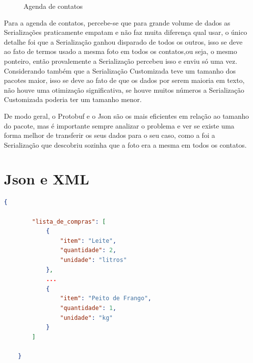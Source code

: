 \documentclass{article}
\begin{document}
\begin{figure}[H]
    \centering
    \caption{Agenda de contatos}
\end{figure}
Para a agenda de contatos, percebe-se que para grande volume de dados as Serializações praticamente empatam e não faz muita diferença qual usar, o único detalhe foi que a Serialização ganhou disparado de todos os outros, isso se deve ao fato de termos usado a mesma foto em todos os contatos,ou seja, o mesmo ponteiro, então provalemente a Serialização percebeu isso e enviu só uma vez. Considerando também que a Serialização Customizada teve um tamanho dos pacotes maior, isso se deve ao fato de que os dados por serem maioria em texto, não houve uma otimização significativa, se houve muitos números a Serialização Customizada poderia ter um tamanho menor.

De modo geral, o Protobuf e o Json são os mais eficientes em relação ao tamanho do pacote, mas é importante sempre analizar o problema e ver se existe uma forma melhor de transferir os seus dados para o seu caso, como a foi a Serialização que descobriu sozinha que a foto era a mesma em todos os contatos.

\appendix
\section{Json e XML}

\begin{lstlisting}[language=json, caption=Lista de compras Json.]
    {
        
        "lista_de_compras": [
            {
                "item": "Leite",
                "quantidade": 2,
                "unidade": "litros"
            },
            ...
            {
                "item": "Peito de Frango",
                "quantidade": 1,
                "unidade": "kg"
            }
        ]
    
    }
    \end{lstlisting}
    
\end{document}
